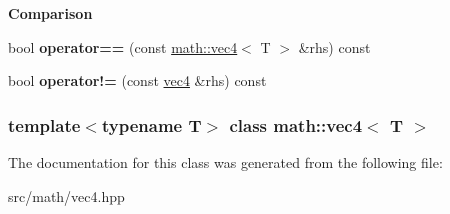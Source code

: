 \begin{Indent}{\bf Comparison}\par
{\em \label{_amgrpf6c0e3a1c3cfabd32ae8d3ae741fcf0a}
 }\begin{DoxyCompactItemize}
\item 
\hypertarget{classmath_1_1vec4_a2b7541c1d4dfed7029c867b3f1439b50}{
bool {\bfseries operator==} (const \hyperlink{classmath_1_1vec4}{math::vec4}$<$ T $>$ \&rhs) const }
\label{classmath_1_1vec4_a2b7541c1d4dfed7029c867b3f1439b50}

\item 
\hypertarget{classmath_1_1vec4_a6a4dfdb631aa3c8879740d2be4872285}{
bool {\bfseries operator!=} (const \hyperlink{classmath_1_1vec4}{vec4} \&rhs) const }
\label{classmath_1_1vec4_a6a4dfdb631aa3c8879740d2be4872285}

\end{DoxyCompactItemize}
\end{Indent}
\subsubsection*{template$<$typename T$>$ class math::vec4$<$ T $>$}



The documentation for this class was generated from the following file:\begin{DoxyCompactItemize}
\item 
src/math/vec4.hpp\end{DoxyCompactItemize}
